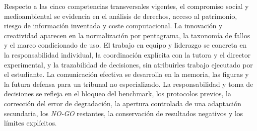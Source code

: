 Respecto a las cinco competencias transversales vigentes, el compromiso social y medioambiental se
evidencia en el análisis de derechos, acceso al patrimonio, riesgo de información inventada y coste
computacional. La innovación y creatividad aparecen en la normalización por pentagrama, la
taxonomía de fallos y el marco condicionado de uso. El trabajo en equipo y liderazgo se concreta en
la responsabilidad individual, la coordinación explícita con la tutora y el director experimental,
y la trazabilidad de decisiones, sin atribuirles trabajo ejecutado por el estudiante. La
comunicación efectiva se desarrolla en la memoria, las figuras
y la futura defensa para un tribunal no especializado. La responsabilidad y toma de decisiones se
refleja en el bloqueo del benchmark, los protocolos previos, la corrección del error de degradación,
la apertura controlada de una adaptación secundaria, los \emph{NO-GO} restantes, la conservación
de resultados negativos y los límites explícitos.
